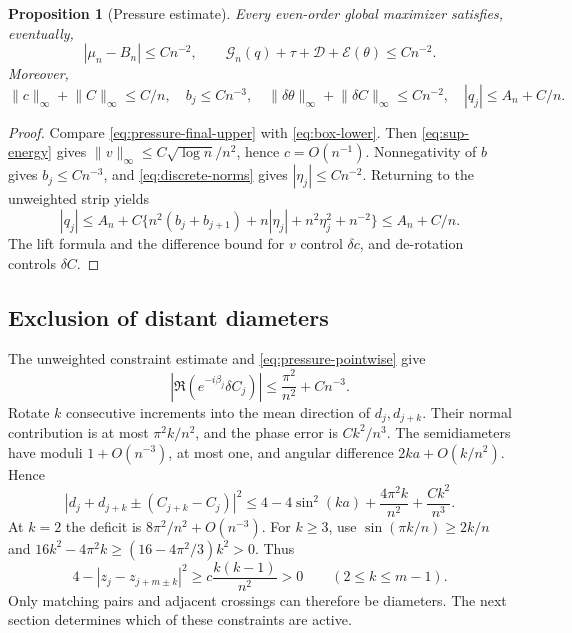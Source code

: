 \documentclass[11pt,reqno]{amsart}
\numberwithin{equation}{section}
\newtheorem{proposition}[theorem]{Proposition}
\theoremstyle{definition}
\theoremstyle{remark}
\newcommand{\E}{\mathcal E}
\newcommand{\norm}[1]{\lVert #1\rVert}
\newcommand{\dd}{\delta}
\begin{document}
\begin{proposition}[Pressure estimate]\label{prop:pressure}
Every even-order global maximizer satisfies, eventually,
\begin{equation}\label{eq:pressure-conclusion}
 |\mu_n-B_n|\le Cn^{-2},\qquad
 \mathscr G_n(q)+\tau+\mathscr D+\E(\theta)\le Cn^{-2}.
\end{equation}
Moreover,
\begin{equation}\label{eq:pressure-pointwise}
 \norm c_\infty+\norm C_\infty\le C/n,\quad b_j\le Cn^{-3},\quad
 \norm{\dd\theta}_\infty+\norm{\dd C}_\infty\le Cn^{-2},\quad
 |q_j|\le A_n+C/n.
\end{equation}
\end{proposition}
\begin{proof}
Compare \eqref{eq:pressure-final-upper} with \eqref{eq:box-lower}. Then \eqref{eq:sup-energy} gives $\norm v_\infty\le C\sqrt{\log n}/n^2$, hence $c=O(n^{-1})$. Nonnegativity of $b$ gives $b_j\le Cn^{-3}$, and \eqref{eq:discrete-norms} gives $|\eta_j|\le Cn^{-2}$. Returning to the unweighted strip yields
\[
 |q_j|\le A_n+C\{n^2(b_j+b_{j+1})+n|\eta_j|+n^2\eta_j^2+n^{-2}\}\le A_n+C/n.
\]
The lift formula and the difference bound for $v$ control $\dd c$, and de-rotation controls $\dd C$.
\end{proof}

\subsection{Exclusion of distant diameters}
The unweighted constraint estimate and \eqref{eq:pressure-pointwise} give
\[
 |\Re(e^{-i\beta_j}\dd C_j)|\le\frac{\pi^2}{n^2}+Cn^{-3}.
\]
Rotate $k$ consecutive increments into the mean direction of $d_j,d_{j+k}$. Their normal contribution is at most $\pi^2k/n^2$, and the phase error is $Ck^2/n^3$. The semidiameters have moduli $1+O(n^{-3})$, at most one, and angular difference $2ka+O(k/n^2)$. Hence
\begin{equation}\label{eq:nonlocal-bound}
 |d_j+d_{j+k}\pm(C_{j+k}-C_j)|^2
 \le4-4\sin^2(ka)+\frac{4\pi^2k}{n^2}+\frac{Ck^2}{n^3}.
\end{equation}
At $k=2$ the deficit is $8\pi^2/n^2+O(n^{-3})$. For $k\ge3$, use $\sin(\pi k/n)\ge2k/n$ and $16k^2-4\pi^2k\ge(16-4\pi^2/3)k^2>0$. Thus
\begin{equation}\label{eq:nonlocal-margin}
 4-|z_j-z_{j+m\pm k}|^2\ge c\frac{k(k-1)}{n^2}>0
 \qquad(2\le k\le m-1).
\end{equation}
Only matching pairs and adjacent crossings can therefore be diameters. The next section determines which of these constraints are active.
\end{document}
